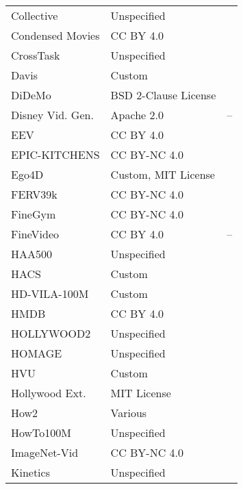 \begin{longtable}{p{5cm}|p{5cm}|p{5cm}}
Collective & Unspecified & \autocite{wongunchoiWhatAreThey2009} \\
Condensed Movies & CC BY 4.0 & \autocite{bainCondensedMoviesStory2020} \\
CrossTask & Unspecified & \autocite{zhukovCrosstaskWeaklySupervised2019} \\
Davis & Custom & \autocite{perazziBenchmarkDatasetEvaluation2016} \\
DiDeMo & BSD 2-Clause License & \autocite{hendricksLocalizingMomentsVideo2018} \\
Disney Vid. Gen. & Apache 2.0 & -- \\
EEV & CC BY 4.0 & \autocite{sunEEVLargeScaleDataset2021} \\
EPIC-KITCHENS & CC BY-NC 4.0 & \autocite{damenScalingEgocentricVision2018} \\
Ego4D & Custom, MIT License & \autocite{graumanEgo4DWorld0002022} \\
FERV39k & CC BY-NC 4.0 & \autocite{wangFERV39kLargeScaleMultiScene2022} \\
FineGym & CC BY-NC 4.0 & \autocite{shaoFineGymHierarchicalVideo2020} \\
FineVideo & CC BY 4.0 & -- \\
HAA500 & Unspecified & \autocite{chungHAA500HumanCentricAtomic2021} \\
HACS & Custom & \autocite{zhaoHACSHumanAction2019} \\
HD-VILA-100M & Custom & \autocite{xueAdvancingHighResolutionVideoLanguage2022} \\
HMDB & CC BY 4.0 & \autocite{kuehneHMDBLargeVideo2011} \\
HOLLYWOOD2 & Unspecified & \autocite{marszalekActionsContext2009} \\
HOMAGE & Unspecified & \autocite{raiHomeActionGenome2021} \\
HVU & Custom & \autocite{dibaLargeScaleHolistic2020} \\
Hollywood Ext. & MIT License & \autocite{bojanowskiWeaklySupervisedAction2014} \\
How2 & Various & \autocite{sanabriaHow2LargescaleDataset2018} \\
HowTo100M & Unspecified & \autocite{miechHowTo100MLearningTextVideo2019} \\
ImageNet-Vid & CC BY-NC 4.0 & \autocite{russakovskyImageNetLargeScale2015} \\
Kinetics & Unspecified & \autocite{kayKineticsHumanAction2017,carreiraShortNoteKinetics6002018,smairaShortNoteKinetics70020202020} \\

\end{longtable}
